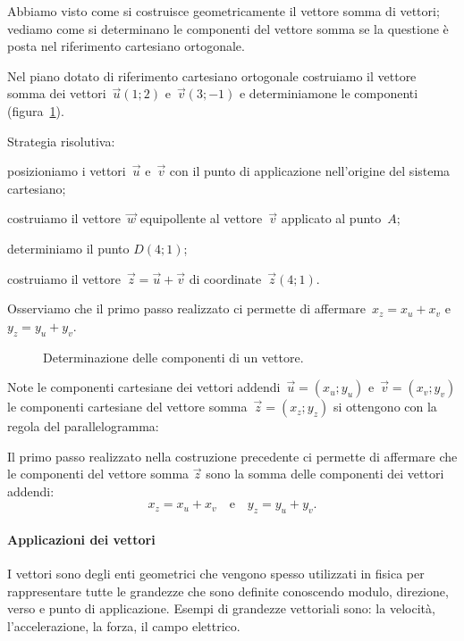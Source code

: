 Abbiamo visto come si costruisce geometricamente il vettore somma di vettori; vediamo come si determinano le componenti del vettore somma se la questione
è posta nel riferimento cartesiano ortogonale.

\begin{exrig}
\begin{esempio}
Nel piano dotato di riferimento cartesiano ortogonale costruiamo il vettore somma dei vettori~$\vec{u}(1;2)$ e~$\vec{v}(3;-1)$ e determiniamone
le componenti (figura~\ref{fig:F.10}).

Strategia risolutiva:
\begin{enumeratea}
\item posizioniamo i vettori~$\vec{u}$ e~$\vec{v}$ con il punto di applicazione nell'origine del sistema cartesiano;
\item costruiamo il vettore~$\vec{w}$ equipollente al vettore~$\vec{v}$ applicato al punto~$A$;
\item determiniamo il punto	$D(4;1)$;
\item costruiamo il vettore~$\vec{z}=\vec{u}+\vec{v}$ di coordinate~$\vec{z}(4;1)$.
\end{enumeratea}
Osserviamo che il primo passo realizzato ci permette di affermare~$x_z=x_u+x_v$ e~$y_z=y_u+y_v$.
\end{esempio}
\end{exrig}
\begin{figure}[t]
\centering

\caption{Determinazione delle componenti di un vettore.}\label{fig:F.10}
\end{figure}

\begin{procedura} Note le componenti cartesiane dei vettori addendi~$\vec{u}=(x_u;y_u)$ e~$\vec{v}=(x_v;y_v)$ le
 componenti cartesiane del vettore somma~$\vec{z}=(x_z;y_z)$ si ottengono con la regola del parallelogramma:

Il primo passo realizzato nella costruzione precedente ci permette di affermare che le componenti del vettore somma $\vec{z}$ sono la somma
delle componenti dei vettori addendi:\[x_z=x_u+x_v\quad\text{e}\quad y_z=y_u+y_v.\]
\end{procedura}

\ovalbox{\risolvi \ref{ese:F.3}}

\paragraph{Applicazioni dei vettori}
I vettori sono degli enti geometrici che vengono spesso utilizzati in fisica per rappresentare tutte le grandezze che sono definite conoscendo modulo, direzione,
verso e punto di applicazione. Esempi di grandezze vettoriali sono: la velocità, l'accelerazione, la forza, il campo elettrico.

